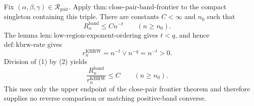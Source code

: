 Fix \((\alpha,\beta,\gamma)\in\mathcal R_{\mathrm{pair}}\).  Apply
\(\mathrm{thm:close\mbox{-}pair\mbox{-}band\mbox{-}frontier}\) to the
compact singleton containing this triple.  There are constants
\(C<\infty\) and \(n_0\) such that
\[
R_n^{\mathrm{band}}\leq Cn^{-t}
\qquad(n\geq n_0).
\tag{1}
\]
The lemma
\(\mathrm{lem:low\mbox{-}region\mbox{-}exponent\mbox{-}ordering}\) gives
\(t<q\), and hence \(\mathrm{def:kbrw\mbox{-}rate}\) gives
\[
r_n^{\mathrm{KBRW}}=n^{-t}\vee n^{-q}=n^{-t}>0.
\tag{2}
\]
Division of (1) by (2) yields
\[
\frac{R_n^{\mathrm{band}}}{r_n^{\mathrm{KBRW}}}\leq C
\qquad(n\geq n_0).
\]
This uses only the upper endpoint of the close-pair frontier theorem and
therefore supplies no reverse comparison or matching positive-band converse.